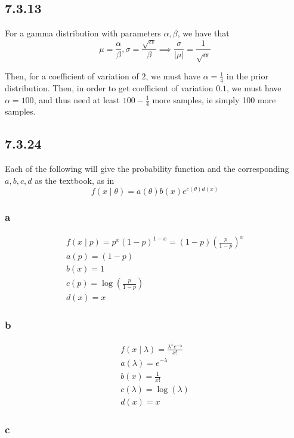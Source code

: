 \documentclass[12pt,letterpaper]{article}
\theoremstyle{definition}
\begin{document}
\subsection*{7.3.13}

For a gamma distribution with parameters $\alpha, \beta$, we have that
\[
  \mu = \frac{\alpha}{\beta}, \sigma = \frac{\sqrt{\alpha}}{\beta} \implies
  \frac{\sigma}{|\mu|} = \frac{1}{\sqrt{\alpha}}
\]

Then, for a coefficient of variation of $2$, we must have $\alpha = \frac{1}{4}$ in the
prior distribution. Then, in order to get coefficient of variation $0.1$, we
must have $\alpha = 100$, and thus need at least $100 - \frac{1}{4}$ more
samples, ie simply 100 more samples.

\subsection*{7.3.24}

Each of the following will give the probability function and the corresponding
$a, b, c, d$ as the textbook, as in
\[
  f(x \mid \theta) = a(\theta)b(x)e^{c(\theta)d(x)}
\]

\subsubsection*{a}

\begin{gather*}
  f(x \mid p) = p^x(1-p)^{1-x} = (1-p)(\frac{p}{1-p})^x \\
  a(p) = (1-p) \\
  b(x) = 1 \\
  c(p) = \log(\frac{p}{1-p}) \\
  d(x) = x
\end{gather*}

\subsubsection*{b}

\begin{gather*}
  f(x \mid \lambda) = \frac{\lambda^xe^{-\lambda}}{x!} \\
  a(\lambda) = e^{-\lambda} \\
  b(x) = \frac{1}{x!} \\
  c(\lambda) = \log(\lambda) \\
  d(x) = x
\end{gather*}

\subsubsection*{c}
\end{document}
